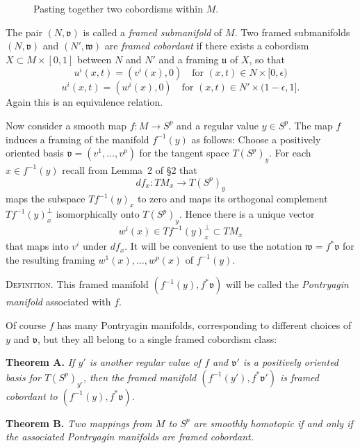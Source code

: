 
\begin{figure}[htbp]
\centering
\setcounter{figure}{14}%
\caption{Pasting together two cobordisms within $M$.}\label{fig:milnor-15}
\end{figure}

The pair $(N, \mathfrak{v})$ is called a \emph{framed submanifold} of $M$. Two framed submanifolds $(N, \mathfrak{v})$ and $(N', \mathfrak{w})$ are \emph{framed cobordant} if there exists a cobordism $X \subset M \times [0, 1]$ between $N$ and $N'$ and a framing $\mathfrak{u}$ of $X$, so that
\[
u^i(x, t) = (v^i(x), 0) \quad \text{for } (x, t) \in N \times [0, \epsilon)
\]
\[
u^i(x, t) = (w^i(x), 0) \quad \text{for } (x, t) \in N' \times (1 - \epsilon, 1].
\]
Again this is an equivalence relation.

Now consider a smooth map $f : M \to S^p$ and a regular value $y \in S^p$. The map $f$ induces a framing of the manifold $f^{-1}(y)$ as follows: Choose a positively oriented basis $\mathfrak{v} = (v^1, \ldots, v^p)$ for the tangent space $T(S^p)_y$. For each $x \in f^{-1}(y)$ recall from Lemma~2 of \S2 that
\[
df_x : TM_x \to T(S^p)_y
\]
maps the subspace $Tf^{-1}(y)_x$ to zero and maps its orthogonal complement $Tf^{-1}(y)_x^\perp$ isomorphically onto $T(S^p)_y$. Hence there is a unique vector
\[
w^i(x) \in Tf^{-1}(y)_x^\perp \subset TM_x
\]
that maps into $v^i$ under $df_x$. It will be convenient to use the notation $\mathfrak{w} = f^*\mathfrak{v}$ for the resulting framing $w^1(x), \ldots, w^p(x)$ of $f^{-1}(y)$.

\textsc{Definition.} This framed manifold $(f^{-1}(y), f^*\mathfrak{v})$ will be called the \emph{Pontryagin manifold} associated with $f$.

Of course $f$ has many Pontryagin manifolds, corresponding to different choices of $y$ and $\mathfrak{v}$, but they all belong to a single framed cobordism class:

\noindent\textbf{Theorem A.} \textit{If $y'$ is another regular value of $f$ and $\mathfrak{v}'$ is a positively oriented basis for $T(S^p)_{y'}$, then the framed manifold $(f^{-1}(y'), f^*\mathfrak{v}')$ is framed cobordant to $(f^{-1}(y), f^*\mathfrak{v})$.}

\noindent\textbf{Theorem B.} \textit{Two mappings from $M$ to $S^p$ are smoothly homotopic if and only if the associated Pontryagin manifolds are framed cobordant.}


